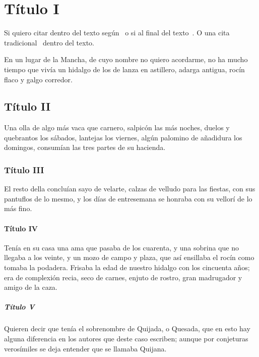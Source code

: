\section{\large Título I}

Si quiero citar dentro del texto según~\textcite{cervantes1999} 
o si al final del texto~\parencite{cervantes1999}. O una cita tradicional~\cite{cervantes1999} dentro del texto.

En un lugar de la Mancha, de cuyo nombre no quiero acordarme, no ha mucho tiempo que vivía un hidalgo de los de lanza en astillero, adarga antigua, rocín flaco y galgo corredor.
\subsection{Título II} 
Una olla de algo más vaca que carnero, salpicón las más noches, duelos y quebrantos los sábados, lantejas los viernes, algún palomino de añadidura los domingos, consumían las tres partes de su hacienda. 

\subsubsection{Título III}
El resto della concluían sayo de velarte, calzas de velludo para las fiestas, con sus pantuflos de lo mesmo, y los días de entresemana se honraba con su vellorí de lo más fino.
\paragraph{Título IV}
Tenía en su casa una ama que pasaba de los cuarenta, y una sobrina que no llegaba a los veinte, y un mozo de campo y plaza, que así ensillaba el rocín como tomaba la podadera.
Frisaba la edad de nuestro hidalgo con los cincuenta años; era de complexión recia, seco de carnes, enjuto de rostro, gran madrugador y amigo de la caza. 
\subparagraph{Título V}
Quieren decir que tenía el sobrenombre de Quijada, o Quesada, que en esto hay alguna diferencia en los autores que deste caso escriben; aunque por conjeturas verosímiles se deja entender que se llamaba Quijana.



\lipsum[1] %

\lipsum[2-3] %



